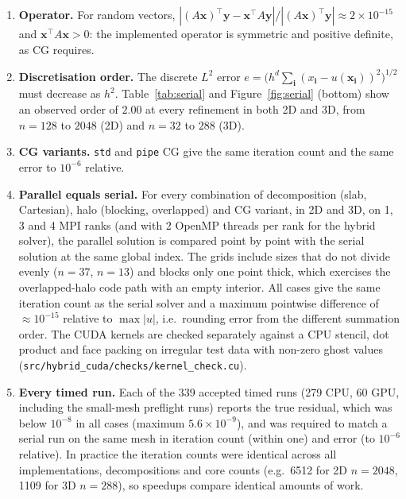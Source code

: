\documentclass[11pt,a4paper]{article}
\begin{document}
\begin{enumerate}
\item \textbf{Operator.} For random vectors, $|(A\mathbf x)^{\top}\mathbf y-\mathbf x^{\top}A\mathbf y|/|(A\mathbf x)^{\top}\mathbf y|\approx2\times10^{-15}$ and $\mathbf x^{\top}A\mathbf x>0$: the implemented operator is symmetric and positive definite, as CG requires.
\item \textbf{Discretisation order.} The discrete $L^2$ error
$e=\big(h^d\sum_{\mathbf i}(x_{\mathbf i}-u(\mathbf x_{\mathbf i}))^2\big)^{1/2}$ must decrease as $h^2$.
Table~\ref{tab:serial} and Figure~\ref{fig:serial} (bottom) show an observed order of $2.00$ at every
refinement in both 2D and 3D, from $n=128$ to $2048$ (2D) and $n=32$ to $288$ (3D).
\item \textbf{CG variants.} \texttt{std} and \texttt{pipe} CG give the same iteration count and the same error
to $10^{-6}$ relative.
\item \textbf{Parallel equals serial.} For every combination of decomposition (slab, Cartesian), halo
(blocking, overlapped) and CG variant, in 2D and 3D, on 1, 3 and 4 MPI ranks (and with 2 OpenMP
threads per rank for the hybrid solver), the parallel solution is compared point by point with
the serial solution at the same global index. The grids include sizes that do not divide evenly
($n=37$, $n=13$) and blocks only one point thick, which exercises the overlapped-halo code path
with an empty interior. All cases give the same iteration count as the serial solver and a
maximum pointwise difference of $\approx10^{-15}$ relative to $\max|u|$, i.e.\ rounding error from the
different summation order. The CUDA kernels are checked separately against a CPU stencil, dot
product and face packing on irregular test data with non-zero ghost values (\texttt{src/hybrid\_cuda/checks/kernel\_check.cu}).
\item \textbf{Every timed run.} Each of the 339 accepted timed runs (279 CPU, 60 GPU, including the
small-mesh preflight runs) reports the true residual, which was below $10^{-8}$ in all cases (maximum
$5.6\times10^{-9}$), and was required to match a serial run on the same mesh in iteration count
(within one) and error (to $10^{-6}$ relative). In practice the iteration counts were identical
across all implementations, decompositions and core counts (e.g.\ 6512 for 2D $n=2048$,
1109 for 3D $n=288$), so speedups compare identical amounts of work.
\end{enumerate}

\end{document}

